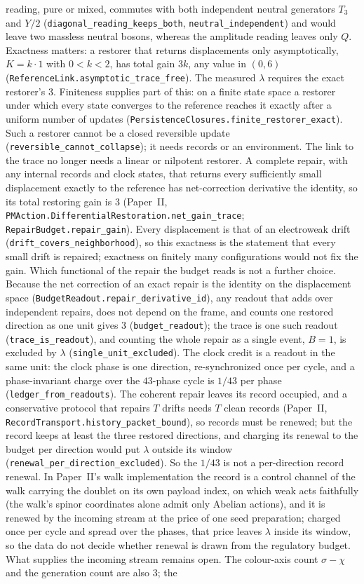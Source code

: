 reading, pure or mixed, commutes with both independent neutral generators $T_3$ and $Y/2$ (\texttt{diagonal\_reading\_keeps\_both}, \texttt{neutral\_independent}) and would leave two massless neutral bosons, whereas the amplitude reading leaves only $Q$. Exactness matters: a restorer that returns displacements only asymptotically, $K=k\cdot1$ with $0<k<2$, has total gain $3k$, any value in $(0,6)$ (\texttt{ReferenceLink.asymptotic\_trace\_free}). The measured $\lambda$ requires the exact restorer's $3$. Finiteness supplies part of this: on a finite state space a restorer under which every state converges to the reference reaches it exactly after a uniform number of updates (\texttt{PersistenceClosures.finite\_restorer\_exact}). Such a restorer cannot be a closed reversible update (\texttt{reversible\_cannot\_collapse}); it needs records or an environment. The link to the trace no longer needs a linear or nilpotent restorer. A complete repair, with any internal records and clock states, that returns every sufficiently small displacement exactly to the reference has net-correction derivative the identity, so its total restoring gain is $3$ (Paper~II, \texttt{PMAction.DifferentialRestoration.net\_gain\_trace}; \texttt{RepairBudget.repair\_gain}). Every displacement is that of an electroweak drift (\texttt{drift\_covers\_neighborhood}), so this exactness is the statement that every small drift is repaired; exactness on finitely many configurations would not fix the gain. Which functional of the repair the budget reads is not a further choice. Because the net correction of an exact repair is the identity on the displacement space (\texttt{BudgetReadout.repair\_derivative\_id}), any readout that adds over independent repairs, does not depend on the frame, and counts one restored direction as one unit gives $3$ (\texttt{budget\_readout}); the trace is one such readout (\texttt{trace\_is\_readout}), and counting the whole repair as a single event, $B=1$, is excluded by $\lambda$ (\texttt{single\_unit\_excluded}). The clock credit is a readout in the same unit: the clock phase is one direction, re-synchronized once per cycle, and a phase-invariant charge over the $43$-phase cycle is $1/43$ per phase (\texttt{ledger\_from\_readouts}). The coherent repair leaves its record occupied, and a conservative protocol that repairs $T$ drifts needs $T$ clean records (Paper~II, \texttt{RecordTransport.history\_packet\_bound}), so records must be renewed; but the record keeps at least the three restored directions, and charging its renewal to the budget per direction would put $\lambda$ outside its window (\texttt{renewal\_per\_direction\_excluded}). So the $1/43$ is not a per-direction record renewal. In Paper~II's walk implementation the record is a control channel of the walk carrying the doublet on its own payload index, on which weak acts faithfully (the walk's spinor coordinates alone admit only Abelian actions), and it is renewed by the incoming stream at the price of one seed preparation; charged once per cycle and spread over the phases, that price leaves $\lambda$ inside its window, so the data do not decide whether renewal is drawn from the regulatory budget. What supplies the incoming stream remains open. The colour-axis count $\sigma-\chi$ and the generation count are also $3$; the 